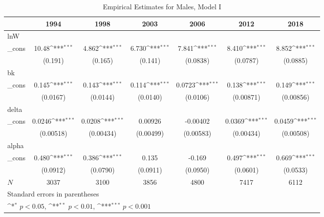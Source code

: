 \documentclass[12pt,a4paper]{article}
\begin{document}
	\begin{table}[htbp]\centering
		\def\sym#1{\ifmmode^{#1}\else\(^{#1}\)\fi}
		\caption{Empirical Estimates for Males, Model I}
		\begin{tabular}{l*{6}{c}}
			\hline\hline
			&\multicolumn{1}{c}{1994}&\multicolumn{1}{c}{1998}&\multicolumn{1}{c}{2003}&\multicolumn{1}{c}{2006}&\multicolumn{1}{c}{2012}&\multicolumn{1}{c}{2018}\\
			\hline
			lnW         &                     &                     &                     &                     &                     &                     \\
			\_cons      &       10.48\sym{***}&       4.862\sym{***}&       6.730\sym{***}&       7.841\sym{***}&       8.410\sym{***}&       8.852\sym{***}\\
			&     (0.191)         &     (0.165)         &     (0.141)         &    (0.0838)         &    (0.0787)         &    (0.0885)         \\
			\hline
			bk          &                     &                     &                     &                     &                     &                     \\
			\_cons      &       0.145\sym{***}&       0.143\sym{***}&       0.114\sym{***}&      0.0723\sym{***}&       0.138\sym{***}&       0.149\sym{***}\\
			&    (0.0167)         &    (0.0144)         &    (0.0140)         &    (0.0106)         &   (0.00871)         &   (0.00856)         \\
			\hline
			delta       &                     &                     &                     &                     &                     &                     \\
			\_cons      &      0.0246\sym{***}&      0.0208\sym{***}&     0.00926         &    -0.00402         &      0.0369\sym{***}&      0.0459\sym{***}\\
			&   (0.00518)         &   (0.00434)         &   (0.00499)         &   (0.00583)         &   (0.00434)         &   (0.00508)         \\
			\hline
			alpha       &                     &                     &                     &                     &                     &                     \\
			\_cons      &       0.480\sym{***}&       0.386\sym{***}&       0.135         &      -0.169         &       0.497\sym{***}&       0.669\sym{***}\\
			&    (0.0912)         &    (0.0790)         &    (0.0911)         &    (0.0950)         &    (0.0601)         &    (0.0533)         \\
			\hline
			\(N\)       &        3037         &        3100         &        3856         &        4800         &        7417         &        6112         \\
			\hline\hline
			\multicolumn{7}{l}{\footnotesize Standard errors in parentheses}\\
			\multicolumn{7}{l}{\footnotesize \sym{*} \(p<0.05\), \sym{**} \(p<0.01\), \sym{***} \(p<0.001\)}\\
		\end{tabular}
	\end{table}
	
\end{document}
